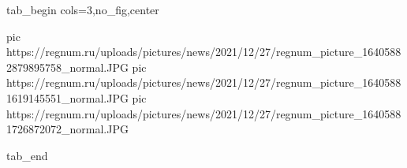  
 
 
 
 


\ifcmt
  tab_begin cols=3,no_fig,center

     pic https://regnum.ru/uploads/pictures/news/2021/12/27/regnum_picture_16405882879895758_normal.JPG
		 pic https://regnum.ru/uploads/pictures/news/2021/12/27/regnum_picture_16405881619145551_normal.JPG
		 pic https://regnum.ru/uploads/pictures/news/2021/12/27/regnum_picture_16405881726872072_normal.JPG

  tab_end
\fi

